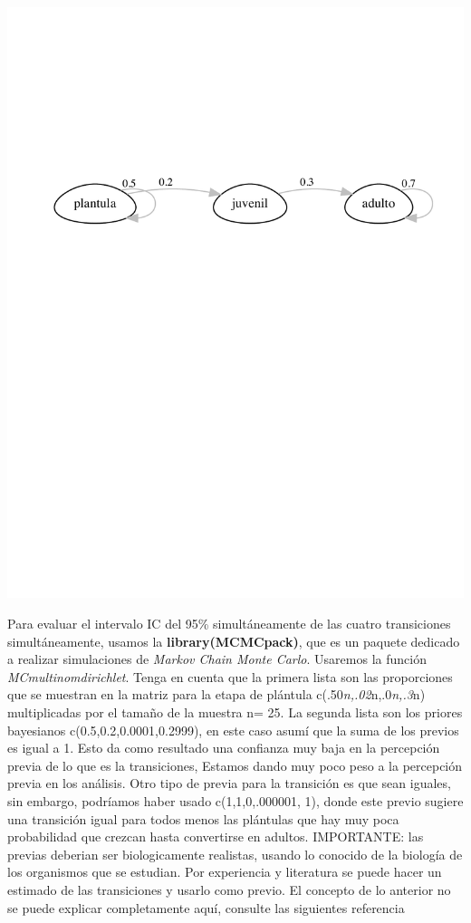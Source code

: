 \documentclass[
]{book}
\theoremstyle{definition}
\theoremstyle{definition}
\theoremstyle{definition}
\theoremstyle{definition}
\theoremstyle{remark}
\begin{document}
\includegraphics{Diagnostico_Poblacional_files/figure-latex/unnamed-chunk-50-1.pdf}

Para evaluar el intervalo IC del 95\% simultáneamente de las cuatro transiciones simultáneamente, usamos la \textbf{library(MCMCpack)}, que es un paquete dedicado a realizar simulaciones de \emph{Markov Chain Monte Carlo}. Usaremos la función \emph{MCmultinomdirichlet}. Tenga en cuenta que la primera lista son las proporciones que se muestran en la matriz para la etapa de plántula c(.50\emph{n,.02}n,.0\emph{n,.3}n) multiplicadas por el tamaño de la muestra n= 25. La segunda lista son los priores bayesianos c(0.5,0.2,0.0001,0.2999), en este caso asumí que la suma de los previos es igual a 1. Esto da como resultado una confianza muy baja en la percepción previa de lo que es la transiciones, Estamos dando muy poco peso a la percepción previa en los análisis. Otro tipo de previa para la transición es que sean iguales, sin embargo, podríamos haber usado c(1,1,0,.000001, 1), donde este previo sugiere una transición igual para todos menos las plántulas que hay muy poca probabilidad que crezcan hasta convertirse en adultos. IMPORTANTE: las previas deberian ser biologicamente realistas, usando lo conocido de la biología de los organismos que se estudian. Por experiencia y literatura se puede hacer un estimado de las transiciones y usarlo como previo. El concepto de lo anterior no se puede explicar completamente aquí, consulte las siguientes referencia \citep{tremblay2021population, van2021bayesian}
\end{document}
